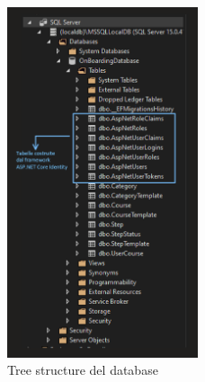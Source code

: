 \begin{figure}[ht]
	\centering
	\includegraphics[width=0.5\textwidth]{img/TreeStructureDatabase.png}
	\caption{Tree structure del database}
	\label{fig:two}
\end{figure}
%
